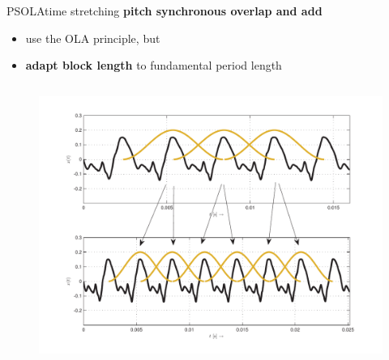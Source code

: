     \begin{frame}{PSOLA}{time stretching}
            \textbf{pitch synchronous overlap and add}
            \begin{itemize}
                \item   use the OLA principle, but
                \item	\textbf{adapt block length} to fundamental period length
            \end{itemize}
            \pause
            \begin{columns}
                    \begin{figure}
                        \centering
                        \includegraphics[scale=.3]{graph/PSOLA.pdf}

\end{figure}
\end{columns}
\end{frame}

